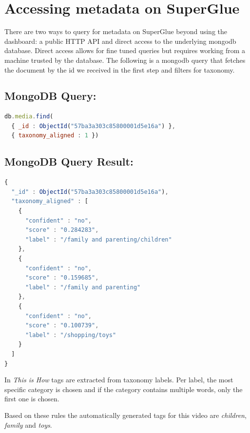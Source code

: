 \section{Accessing metadata on SuperGlue}

There are two ways to query for metadata on SuperGlue beyond using the dashboard: a public HTTP API and direct access to the underlying mongodb\cite{mongodb} database. Direct access allows for fine tuned queries but requires working from a machine trusted by the database. The following is a mongodb query that fetches the document by the id we received in the first step and filters for taxonomy.

\subsection*{MongoDB Query:}

\begin{lstlisting}[language=javascript]
db.media.find(
  { _id : ObjectId("57ba3a303c85800001d5e16a") },
  { taxonomy_aligned : 1 })
\end{lstlisting}

\vspace*{12pt}
\subsection*{MongoDB Query Result:}

\begin{lstlisting}[language=javascript]
{
  "_id" : ObjectId("57ba3a303c85800001d5e16a"),
  "taxonomy_aligned" : [
    {
      "confident" : "no",
      "score" : "0.284283",
      "label" : "/family and parenting/children"
    },
    {
      "confident" : "no",
      "score" : "0.159685",
      "label" : "/family and parenting"
    },
    {
      "confident" : "no",
      "score" : "0.100739",
      "label" : "/shopping/toys"
    }
  ]
}
\end{lstlisting}

In \textit{This is How} tags are extracted from taxonomy labels. Per label, the most specific category is chosen and if the category contains multiple words, only the first one is chosen. 

Based on these rules the automatically generated tags for this video are \textit{children}, \textit{family} and \textit{toys}.